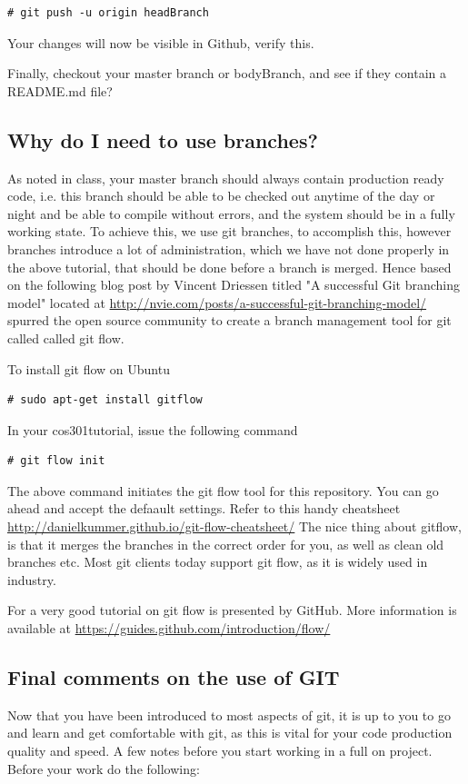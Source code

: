 \documentclass[a4paper,10pt]{article}
\begin{document}
\begin{lstlisting}[style=TerminalStyle]
# git push -u origin headBranch
\end{lstlisting}

Your changes will now be visible in Github, verify this.

Finally, checkout your master branch or bodyBranch, and see if they contain a README.md file?

\subsection{Why do I need to use branches?}

As noted in class, your master branch should always contain production ready code, i.e. this branch should be able to be checked out anytime of the day or night and be able to compile without errors, and the system should be in a fully working state. To achieve this, we use git branches, to accomplish this, however branches introduce a lot of administration, which we have not done properly in the above tutorial, that should be done before a branch is merged.  Hence based on the following blog post by Vincent Driessen titled "A successful Git branching model" located at \url{http://nvie.com/posts/a-successful-git-branching-model/} spurred the open source community to create a branch management tool for git called called git flow.

To install git flow on Ubuntu
\begin{lstlisting}[style=TerminalStyle]
# sudo apt-get install gitflow
\end{lstlisting}

In your cos301tutorial, issue the following command
\begin{lstlisting}[style=TerminalStyle]
# git flow init
\end{lstlisting}

The above command initiates the git flow tool for this repository. You can go ahead and accept the defaault settings. Refer to this handy cheatsheet \url{http://danielkummer.github.io/git-flow-cheatsheet/}
The nice thing about gitflow, is that it merges the branches in the correct order for you, as well as clean old branches etc. Most git clients today support git flow, as it is widely used in industry.

For a very good tutorial on git flow is presented by GitHub. More information is available at \url{https://guides.github.com/introduction/flow/}

\subsection{Final comments on the use of GIT}
Now that you have been introduced to most aspects of git, it is up to you to go and learn and get comfortable with git, as this is vital for your code production quality and speed. 
A few notes before you start working in a full on project.
Before your work do the following:
\end{document}
